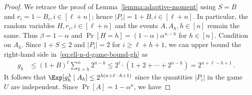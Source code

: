     \begin{proof}
        We retrace the proof of Lemma~\ref{lemma:adaptive-moment} 
        using $S = B$ and $r_i = 1 - B_i, i \in [\ell + n]$; 
        hence $|P_i| = 1 + B, i \in [\ell + n]$. 
        In particular, the random variables $H, r_i, i \in [\ell + n]$ 
        and the 
        events $A, A_h, h \in [n]$ remain the same. 
        Thus $\beta = 1 - \alpha$ and 
        $\Pr[H = h] = (1 - \alpha) \alpha^{n - h}$ for $h \in [n]$. 
        Condition on $A_h$. 
        Since $1 + S \leq 2$ and $|P_i| = 2$ for $i \geq \ell + h + 1$, 
        we can upper bound the right-hand side in~\eqref{eq:ell-n-d-game-bound-gh} as 
        \begin{align*}
            g_h
            &\leq (1 + B)^\ell \sum_{k = h}^n 2^{n - k}
            \leq 
                2^{\ell} \cdot ( 1 + 2 + \cdots + 2^{n - h} ) 
            = 2^{n + \ell - h + 1}
        \,.
        \end{align*}
        It follows that
        $
            \Exp [g_h^\lambda \mid A_h]
            \leq 
                2^{\lambda(n + \ell - h + 1)} 
        $ 
        since 
        the quantities $|P_{i}|$ in the game $U$ are independent. 
        Since $\Pr[A] = 1 - \alpha^n$, we have 

\end{proof}
